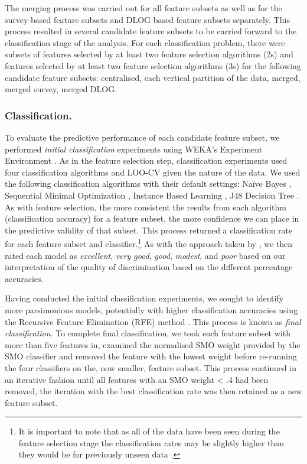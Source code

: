 \documentclass[
  12pt,
  a4paper,
]{book}
\begin{document}
The merging process was carried out for all feature subsets as well as for the survey-based feature subsets and DLOG based feature subsets separately. This process resulted in several candidate feature subsets to be carried forward to the classification stage of the analysis. For each classification problem, there were subsets of features selected by at least two feature selection algorithms (2s) and features selected by at least two feature selection algorithms (3s) for the following candidate feature subsets: centralised, each vertical partition of the data, merged, merged survey, merged DLOG.

\hypertarget{classification.}{%
\subsubsection{Classification.}\label{classification.}}

To evaluate the predictive performance of each candidate feature subset, we performed \emph{initial classification} experiments using WEKA's Experiment Environment \citep{Bouckaert2018, Frank2016}. As in the feature selection step, classification experiments used four classification algorithms and LOO-CV given the nature of the data. We used the following classification algorithms with their default settings: Naïve Bayes \citep[NB;][]{John1995}, Sequential Minimal Optimization \citep[SMO;][]{Platt1998}, Instance Based Learning \citep[IBk;][]{Aha1991}, J48 Decision Tree \citep[J48;][]{Quinlan1993}. As with feature selection, the more consistent the results from each algorithm (classification accuracy) for a feature subset, the more confidence we can place in the predictive validity of that subset. This process returned a classification rate for each feature subset and classifier.\footnote{It is important to note that as all of the data have been seen during the feature selection stage the classification rates may be slightly higher than they would be for previously unseen data \citep{Kuncheva2018, Smialowski2010}.} As with the approach taken by \citet{Gullich2019}, we then rated each model as \emph{excellent}, \emph{very good}, \emph{good}, \emph{modest}, and \emph{poor} based on our interpretation of the quality of discrimination based on the different percentage accuracies.

Having conducted the initial classification experiments, we sought to identify more parsimonious models, potentially with higher classification accuracies using the Recursive Feature Elimination (RFE) method \citep{Guyon2002}. This process is known as \emph{final classification}. To complete final classification, we took each feature subset with more than five features in, examined the normalised SMO weight provided by the SMO classifier and removed the feature with the lowest weight before re-running the four classifiers on the, now smaller, feature subset. This process continued in an iterative fashion until all features with an SMO weight \textless{} .4 had been removed, the iteration with the best classification rate was then retained as a new feature subset.
\end{document}
